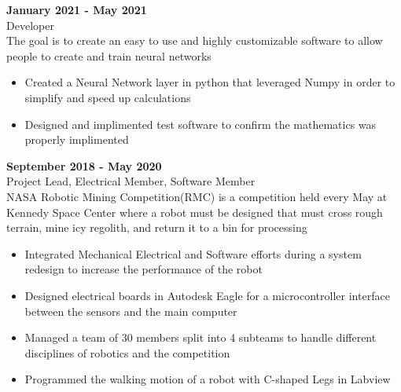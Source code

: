 \documentclass[10pt]{article}
\newcommand{\entrySpacing}{4pt}
\begin{document}
\noindent\begin{minipage}{\linewidth}
 \hfill \textbf{January 2021 - May 2021}\\
Developer\hfill \\The goal is to create an easy to use and highly customizable software to allow people to create and train neural networks
\begin{itemize}[noitemsep,nolistsep]
\item Created a Neural Network layer in python that leveraged Numpy in order to simplify and speed up calculations
\item Designed and implimented test software to confirm the mathematics was properly implimented
\end{itemize}


\end{minipage}
\vspace{\entrySpacing}

\noindent\begin{minipage}{\linewidth}
 \hfill \textbf{September 2018 - May 2020}\\
Project Lead, Electrical Member, Software Member\hfill \\NASA Robotic Mining Competition(RMC) is a competition held every May at Kennedy Space Center where a robot must be designed that must cross rough terrain, mine icy regolith, and return it to a bin for processing
\begin{itemize}[noitemsep,nolistsep]
\item Integrated Mechanical Electrical and Software efforts during a system redesign  to increase the performance of the robot
\item Designed electrical boards in Autodesk Eagle for a microcontroller interface between the sensors and the main computer
\item Managed a team of 30 members split into 4 subteams to handle different disciplines of robotics and the competition
\item Programmed the walking motion of a robot with C-shaped Legs in Labview
\end{itemize}


\end{minipage}
\vspace{\entrySpacing}
\end{document}
